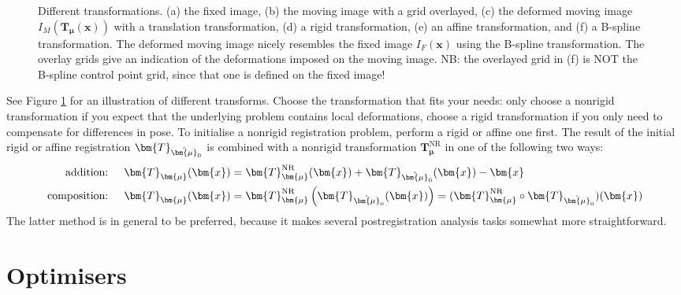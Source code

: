 \documentclass[]{report}
\newcommand{\vx}{\bm{x}}
\newcommand{\vmu}{\bm{\mu}}
\newcommand{\vT}{\bm{T}}
\newcommand{\vTm}{\bm{T}_{\vmu}}
\newcommand{\vTmx}{\bm{T}_{\vmu}(\bm{x})}
\begin{document}
\begin{figure}[tb]
\label{sfig:transformexample:f}
\caption{Different transformations. (a) the fixed image, (b) the
moving image with a grid overlayed, (c) the deformed moving image
$I_M(\vTmx)$ with a translation transformation, (d) a rigid
transformation, (e) an affine transformation, and (f) a B-spline
transformation. The deformed moving image nicely resembles the
fixed image $I_F(\vx)$ using the B-spline transformation. The
overlay grids give an indication of the deformations imposed on
the moving image. NB: the overlayed grid in (f) is NOT the
B-spline control point grid, since that one is defined on the
fixed image!} \label{fig:transformexample}
\end{figure}
See Figure \ref{fig:transformexample} for an illustration of different
transforms. Choose the transformation that fits your needs: only choose a
nonrigid transformation if you expect that the underlying problem contains
local deformations, choose a rigid transformation if you only need to
compensate for differences in pose. To initialise a nonrigid registration
problem, perform a rigid or affine one first. The result of the initial rigid
or affine registration $\vT_{\hat\vmu_0}$ is combined with a nonrigid
transformation $\vTm^\mathrm{NR}$ in one of the following two ways:
\begin{align}
  \text{addition: }\quad    & \vTmx = \vTm^\mathrm{NR}(\vx) + \vT_{\hat\vmu_0}(\vx) - \vx\label{eq:addition} \\
  \text{composition: }\quad & \vTmx = \vTm^\mathrm{NR}\left( \vT_{\hat\vmu_0}(\vx) \right)
  = ( \vTm^\mathrm{NR} \circ
  \vT_{\hat\vmu_0})(\vx)\label{eq:composition}
\end{align}
The latter method is in general to be preferred, because it makes
several postregistration analysis tasks somewhat more
straightforward.


\section{Optimisers}\label{sec:comp:optimiser}
\end{document}
